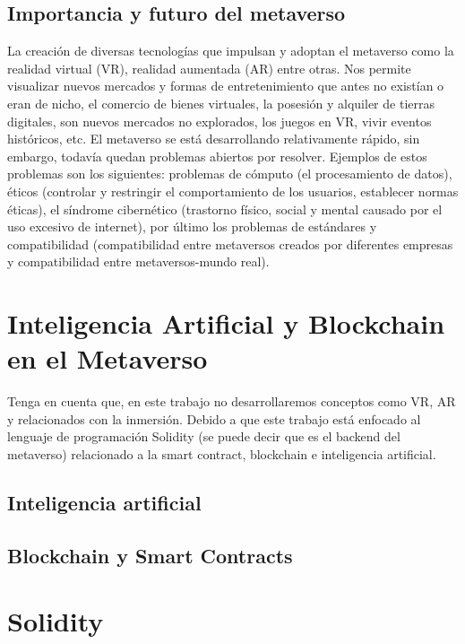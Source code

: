 \documentclass[a4paper,10pt]{article}
\begin{document}
	\subsection{Importancia y futuro del metaverso}
	La creación de diversas tecnologías que impulsan y adoptan el metaverso como la realidad virtual (VR), realidad aumentada (AR) entre otras. Nos permite visualizar nuevos mercados y formas de entretenimiento que antes no existían o eran de nicho, el comercio de bienes virtuales, la posesión y alquiler de tierras digitales, son nuevos mercados no explorados, los juegos en VR, vivir eventos históricos, etc. El metaverso se está desarrollando relativamente rápido, sin embargo, todavía quedan problemas abiertos por resolver. Ejemplos de estos problemas son los siguientes: problemas de cómputo (el procesamiento de datos), éticos (controlar y restringir el comportamiento de los usuarios, establecer normas éticas), el síndrome cibernético (trastorno físico, social y mental causado por el uso excesivo de internet), por último los problemas de estándares y compatibilidad (compatibilidad entre metaversos creados por diferentes empresas y compatibilidad entre metaversos-mundo real).
	
	\section{Inteligencia Artificial y Blockchain en el Metaverso}
	Tenga en cuenta que, en este trabajo no desarrollaremos conceptos como VR, AR y relacionados con la inmersión. Debido a que este trabajo está enfocado al lenguaje de programación Solidity (se puede decir que es el backend del metaverso) relacionado a la smart contract, blockchain e inteligencia artificial.
	\subsection{Inteligencia artificial}
	\subsection{Blockchain y Smart Contracts}
	\section{Solidity}
	\nocite{*}
	\printbibliography[heading=bibintoc]
\end{document}

